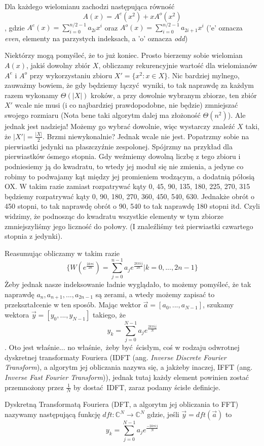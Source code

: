 \begin{observation_small}
Dla każdego wielomianu zachodzi następująca równość $$A(x) = A^e(x^2) + xA^o(x^2)$$, gdzie $A^e(x) = \sum_{i=0}^{n/2 - 1}a_{2i}x^i$ oraz $A^o(x) = \sum_{i=0}^{n/2 - 1} a_{2i+1}x^i$
('e' oznacza \textit{even}, elementy na parzystych indeksach, a 'o' oznacza \textit{odd})
\end{observation_small}
Niektórzy mogą pomyśleć, że to już koniec. Prosto bierzemy sobie wielomian $A(x)$, jakiś dowolny zbiór $X$, obliczamy rekurencyjnie wartość dla wielomianów $A^e$ i $A^o$ przy wykorzystaniu zbioru $X' = \{x^2 : x \in X\}$.
Nic bardziej mylnego, zauważmy bowiem, że gdy będziemy łączyć wyniki, to tak naprawdę za każdym razem wykonamy $\Theta(|X|)$ kroków, a przy dowolnie wybranym zbiorze, ten zbiór $X'$ wcale nie musi (i co najbardziej prawdopodobne, nie będzie) zmniejszać swojego rozmiaru
(Nota bene taki algorytm dalej ma złożoność $\Theta(n^2)$).
Ale jednak jest nadzieja! Możemy go wybrać dowolnie, więc wystarczy znaleźć $X$ taki, że $|X'| = \frac{|X|}{2}$. Brzmi niewykonalnie? Jednak wcale nie jest. Popatrzmy sobie na pierwiastki jedynki na płaszczyźnie zespolonej. Spójrzmy na przykład dla pierwiastków ósmego stopnia.
Gdy weźmiemy dowolną liczbę z tego zbioru i podniesiemy ją do kwadratu, to wtedy jej moduł się nie zmienia, a jedyne co robimy to podwajamy kąt między jej promieniem wodzącym, a dodatnią półosią OX. W takim razie zamiast rozpatrywać kąty 0, 45, 90, 135, 180, 225, 270, 315 będziemy rozpatrywać kąty 0, 90, 180, 270, 360, 450, 540, 630. Jednakże obrót o 450 stopni, to tak naprawdę obrót o 90, 540 to tak naprawdę 180 stopni itd.
Czyli widzimy, że podnosząc do kwadratu wszystkie elementy w tym zbiorze zmniejszyliśmy jego liczność do połowy. (I znaleźliśmy też pierwiastki czwartego stopnia z jedynki).

Reasumując obliczamy w takim razie $$\{W(e^{\frac{2k\pi i}{2n}}) = \sum_{j=0}^{n-1}a_je^{\frac{2k\pi ij}{2n}} | k = 0,...,2n-1\}$$
Żeby jednak nasze indeksowanie ładnie wyglądało, to możemy pomyśleć, że tak naprawdę $a_n, a_{n+1}, ..., a_{2n-1}$ są zerami, a wtedy możemy zapisać to przekształcenie w ten sposób.
Mając wektor $\vec{a} = [a_0, ..., a_{N-1}]$, szukamy wektora $\vec{y} = [y_0, ..., y_{N-1}]$ takiego, że
$$y_k = \sum_{j=0}^{N-1}a_je^{\frac{2k\pi ij}{N}}$$. Oto jest właśnie... no właśnie, żeby być ścisłym, coś w rodzaju odwrotnej dyskretnej transformaty Fouriera (IDFT (ang. \textit{Inverse Discrete Fourier Transform}), a algorytm jej obliczania nazywa się, a jakżeby inaczej, IFFT (ang. \textit{Inverse Fast Fourier Transform})), jednak tutaj każdy element powinien zostać przemnożony przez $\frac{1}{N}$ by dostać IDFT, zaraz podamy ścisłe definicje.
\begin{definition}
    Dyskretną Transformatą Fouriera (DFT, a algorytm jej obliczania to FFT) nazywamy następującą funkcję $dft: \mathbb{C}^N \rightarrow \mathbb{C}^N$
    gdzie, jeśli $\vec{y} = dft(\vec{a})$ to $$y_k = \sum_{j=0}^{N-1}a_je^{\frac{-2k\pi ij}{N}}$$
\end{definition}

